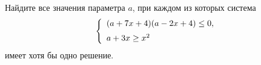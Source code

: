 \begin{ex}
	\begin{condition}
		Найдите все значения параметра \( a \), при каждом из которых система
		\[ \left\{
		\begin{array}{l}
			(a+7x+4)(a-2x+4)\le0,\vspace{2mm}\\
			a+3x\ge x^2
		\end{array}
		\right. \]
		имеет хотя бы одно решение.
	\end{condition}
\end{ex}